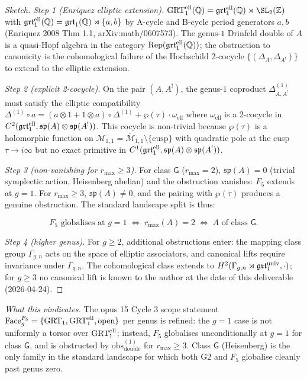 \begin{proof}[Sketch]
\emph{Step 1 (Enriquez elliptic extension).}
$\GRTell(\QQ) = \grt^{\mathrm{ell}}(\QQ) \rtimes \SL_2(\ZZ)$ with
$\mathfrak{grt}_1^{\mathrm{ell}}(\mathbb{Q}) = \mathfrak{grt}_1(\mathbb{Q}) \rtimes \{a, b\}$ by A-cycle and
B-cycle period generators $a, b$ (Enriquez 2008 Thm 1.1,
arXiv:math/0607573). The genus-$1$ Drinfeld double of $A$ is a
quasi-Hopf algebra in the category
$\mathrm{Rep}(\mathfrak{grt}_1^{\mathrm{ell}}(\mathbb{Q}))$; the obstruction to canonicity
is the cohomological failure of the Hochschild 2-cocycle
$\{(\Delta_A, \Delta_{A^!})\}$ to extend to the elliptic extension.

\emph{Step 2 (explicit 2-cocycle).}
On the pair $(A, A^!)$, the genus-$1$ coproduct $\Delta^{(1)}_{A, A^!}$
must satisfy the elliptic compatibility
$\Delta^{(1)} \circ a = (a \otimes 1 + 1 \otimes a) \circ \Delta^{(1)} + \wp(\tau) \cdot \omega_{\mathrm{ell}}$
where $\omega_{\mathrm{ell}}$ is a 2-cocycle in
$C^2(\mathfrak{grt}_1^{\mathrm{ell}}, \mathfrak{sp}(A) \otimes \mathfrak{sp}(A^!))$.
This cocycle is non-trivial because $\wp(\tau)$ is a holomorphic
function on $\mathcal{M}_{1,1} = \overline{\mathcal{M}}_{1,1} \setminus \{\mathrm{cusp}\}$
with quadratic pole at the cusp $\tau \to i\infty$ but no exact
primitive in $C^1(\mathfrak{grt}_1^{\mathrm{ell}}, \mathfrak{sp}(A) \otimes \mathfrak{sp}(A^!))$.

\emph{Step 3 (non-vanishing for $r_{\max} \ge 3$).}
For class $\mathsf{G}$ ($r_{\max} = 2$), $\mathfrak{sp}(A) = 0$
(trivial symplectic action, Heisenberg abelian) and the obstruction
vanishes: $F_5$ extends at $g = 1$. For
$r_{\max} \ge 3$, $\mathfrak{sp}(A) \ne 0$, and the pairing with
$\wp(\tau)$ produces a genuine obstruction. The standard landscape
split is thus:

\[
   F_5\text{ globalises at } g = 1
   \;\Leftrightarrow\;
   r_{\max}(A) = 2
   \;\Leftrightarrow\;
   A \text{ of class } \mathsf{G}.
\]

\emph{Step 4 (higher genus).}
For $g \ge 2$, additional obstructions enter: the mapping class group
$\Gamma_{g,n}$ acts on the space of elliptic associators, and canonical
lifts require invariance under $\Gamma_{g,n}$. The cohomological class
extends to $H^2(\Gamma_{g,n} \rtimes \mathfrak{grt}_1^{\mathrm{univ}}, \cdot)$; for
$g \ge 3$ no canonical lift is known to the author at the date of this
deliverable (2026-04-24).
\end{proof}

\emph{What this vindicates.}
The opus 15 Cycle 3 scope statement
$\mathrm{Face}^{F_5}_g = \{\mathrm{GRT}_1, \mathrm{GRT}_1^{\mathrm{ell}}, \text{open}\}$ per genus is
refined: the $g = 1$ case is not uniformly a torsor over $\mathrm{GRT}_1^{\mathrm{ell}}$;
instead, $F_5$ globalises unconditionally at $g = 1$ for class
$\mathsf{G}$, and is obstructed by
$\mathrm{obs}^{(1)}_{\mathrm{double}}$ for $r_{\max} \ge 3$. Class
$\mathsf{G}$ (Heisenberg) is the only family in the standard landscape
for which both G2 and $F_5$ globalise cleanly past genus zero.

